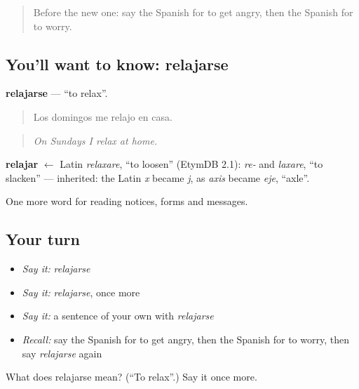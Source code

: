 \label{lesson:ES-C487-relajarse}



\begin{quote}
Before the new one: say the Spanish for to get angry, then the Spanish for to worry.
\end{quote}

\subsection*{You'll want to know: relajarse}
\textbf{relajarse} — \textquotedblleft{}to relax\textquotedblright{}.

\begin{quote}
Los domingos me relajo en casa.
\end{quote}

\begin{quote}
\emph{On Sundays I relax at home.}
\end{quote}

\begin{cousinweb}
\textbf{relajar} $\leftarrow$ Latin \emph{relaxare}, \textquotedblleft{}to loosen\textquotedblright{} (EtymDB 2.1): \emph{re-} and \emph{laxare}, \textquotedblleft{}to slacken\textquotedblright{} — inherited: the Latin \emph{x} became \emph{j}, as \emph{axis} became \emph{eje}, \textquotedblleft{}axle\textquotedblright{}.
\end{cousinweb}

\begin{grammarlens}[title={What you've built}]
One more word for reading notices, forms and messages.
\end{grammarlens}

\subsection*{Your turn}
\begin{itemize}
\raggedright
  \item \emph{Say it:} \emph{relajarse}
  \item \emph{Say it:} \emph{relajarse}, once more
  \item \emph{Say it:} a sentence of your own with \emph{relajarse}
  \item \emph{Recall:} say the Spanish for to get angry, then the Spanish for to worry, then say \emph{relajarse} again
\end{itemize}

\begin{tcolorbox}[breakable,colback=teal!4,colframe=teal!35!black,title={Before you move on}]
What does relajarse mean? (\textquotedblleft{}To relax\textquotedblright{}.) Say it once more.
\end{tcolorbox}
